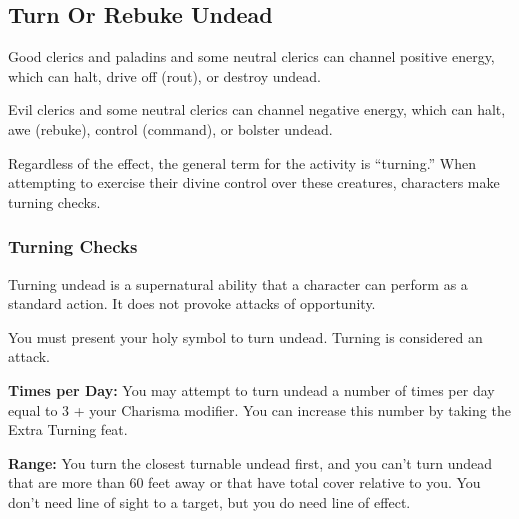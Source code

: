 \subsection{Turn Or Rebuke Undead}
Good clerics and paladins and some neutral clerics can channel positive energy, which can halt, drive off (rout), or destroy undead.

Evil clerics and some neutral clerics can channel negative energy, which can halt, awe (rebuke), control (command), or bolster undead.

Regardless of the effect, the general term for the activity is ``turning.'' When attempting to exercise their divine control over these creatures, characters make turning checks.


\subsubsection{Turning Checks}
Turning undead is a supernatural ability that a character can perform as a standard action. It does not provoke attacks of opportunity.

You must present your holy symbol to turn undead. Turning is considered an attack.

\textbf{Times per Day:} You may attempt to turn undead a number of times per day equal to 3 + your Charisma modifier. You can increase this number by taking the Extra Turning feat.

\textbf{Range:} You turn the closest turnable undead first, and you can't turn undead that are more than 60 feet away or that have total cover relative to you. You don't need line of sight to a target, but you do need line of effect.


